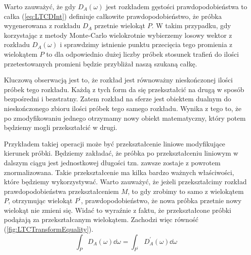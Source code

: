 \documentclass[../main.tex]{subfiles}
\begin{document}
%    

Warto zauważyć, że gdy $D_A(\omega)$ jest rozkładem gęstości prawdopodobieństwa to całka (\ref{eq:LTCDInt}) definiuje całkowite prawdopodobieństwo, że próbka wygenerowana z rozkładu $D_A$ przetnie wielokąt $P$. W takim przypadku, gdy korzystając z metody Monte-Carlo wielokrotnie wybierzemy losowy wektor z rozkładu $D_A(\omega)$ i sprawdzimy istnienie punktu przecięcia tego promienia z wielokątem $P$ to dla odpowiednio dużej liczby próbek stosunek trafień do ilości przetestowanych promieni będzie przybliżał naszą szukaną całkę.

Kluczową obserwacją jest to, że rozkład jest równoważny nieskończonej ilości próbek tego rozkładu. Każdą z tych form da się przekształcić na drugą w sposób bezpośredni i bezstratny. Zatem rozkład na sferze jest obiektem dualnym do nieskończonego zbioru ilości próbek tego samego rozkładu. Wynika z tego to, że po zmodyfikowaniu jednego otrzymamy nowy obiekt matematyczny, który potem będziemy mogli przekształcić w drugi.

Przykładem takiej operacji może być przekształcenie liniowe modyfikujące kierunek próbki. Będziemy zakładać, że próbka po przekształceniu liniowym w dalszym ciągu jest jednostkowej długości tzn. zawsze zostaje z powrotem znormalizowana. Takie przekształcenie ma kilka bardzo ważnych właściwości, które będziemy wykorzystywać. Warto zauważyć, że jeżeli przekształcimy rozkład prawdopodobieństwa przekształceniem $M$, to gdy zrobimy to samo z wielokątem $P$, otrzymując wielokąt $P^\prime$, prawdopodobieństwo, że nowa próbka przetnie nowy wielokąt nie zmieni się. Widać to wyraźnie z faktu, że przekształcone próbki podążają za przekształcanym wielokątem. Zachodzi więc równość (\ref{fig:LTCTransformEquality}).
\begin{equation}
\int_P {
  D_A(\omega)
  \dd \omega
} = \int_{P^\prime} {
  D^\prime_A(\omega)
  \dd \omega
}
\label{fig:LTCTransformEquality}
\end{equation}
\end{document}
